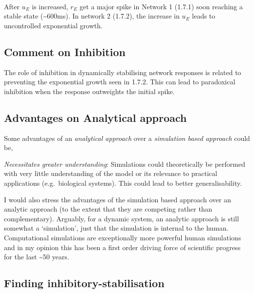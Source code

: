 \documentclass[11pt]{article}
\newcommand{\prompt}[4]{
        {\ttfamily\llap{{\color{#2}[#3]:\hspace{3pt}#4}}\vspace{-\baselineskip}}
    }
\begin{document}
            
\prompt{Out}{outcolor}{11}{}
    
    \begin{center}
    \end{center}
    { \hspace*{\fill} \\}
    

    After \(u_E\) is increased, \(r_E\) get a major spike in Network 1
(1.7.1) soon reaching a stable state (\textasciitilde600ms). In network
2 (1.7.2), the increase in \(u_E\) leads to uncontrolled exponential
growth.

    \hypertarget{comment-on-inhibition}{%
\subsection{Comment on Inhibition}\label{comment-on-inhibition}}

    The role of inhibition in dynamically stabilising network responses is
related to preventing the exponential growth seen in 1.7.2. This can
lead to paradoxical inhibition when the response outweights the initial
spike.

    \hypertarget{advantages-on-analytical-approach}{%
\subsection{Advantages on Analytical
approach}\label{advantages-on-analytical-approach}}

    Some advantages of an \emph{analytical approach} over a \emph{simulation
based approach} could be,

\emph{Necessitates greater understanding}: Simulations could
theoretically be performed with very little understanding of the model
or its relevance to practical applications (e.g.~biological systems).
This could lead to better generalisability.

I would also stress the advantages of the simulation based approach over
an analytic approach (to the extent that they are competing rather than
complementary). Arguably, for a dynamic system, an analytic approach is
still somewhat a `simulation', just that the simulation is internal to
the human. Computational simulations are exceptionally more powerful
human simulations and in my opinion this has been a first order driving
force of scientific progress for the last \textasciitilde50 years.

    \hypertarget{finding-inhibitory-stabilisation}{%
\subsection{Finding
inhibitory-stabilisation}\label{finding-inhibitory-stabilisation}}
\end{document}
